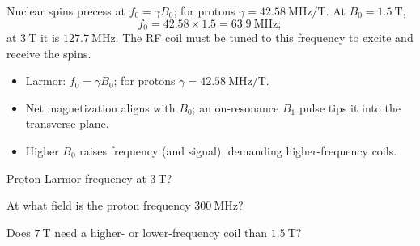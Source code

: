 \begin{workedexample}
Nuclear spins precess at $f_0 = \gamma B_0$; for protons
$\gamma = 42.58\ \text{MHz/T}$. At $B_0 = 1.5\ \text{T}$,
\[ f_0 = 42.58\times1.5 = 63.9\ \text{MHz}; \]
at $3\ \text{T}$ it is $127.7\ \text{MHz}$. The RF coil must be tuned to this
frequency to excite and receive the spins.
\end{workedexample}

\begin{keytakeaways}
\begin{itemize}[leftmargin=1.4em,itemsep=2pt]
\item Larmor: $f_0 = \gamma B_0$; for protons $\gamma = 42.58\ \text{MHz/T}$.
\item Net magnetization aligns with $B_0$; an on-resonance $B_1$ pulse tips it into the transverse plane.
\item Higher $B_0$ raises frequency (and signal), demanding higher-frequency coils.
\end{itemize}
\end{keytakeaways}

\begin{exercises}
\item Proton Larmor frequency at $3\ \text{T}$?
\item At what field is the proton frequency $300\ \text{MHz}$?
\item Does $7\ \text{T}$ need a higher- or lower-frequency coil than $1.5\ \text{T}$?
\end{exercises}

